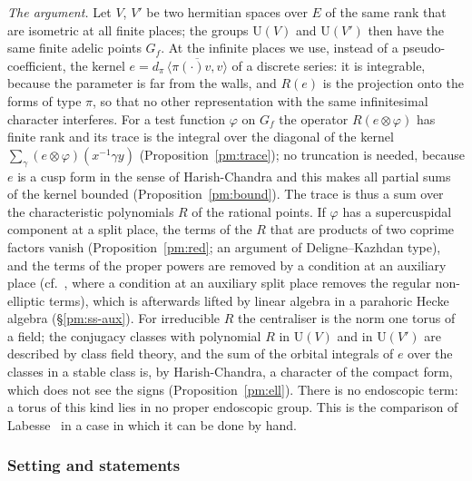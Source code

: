 \documentclass[10pt]{amsart}
\theoremstyle{definition}
\theoremstyle{remark}
\providecommand{\auU}{\mathrm U}
\providecommand{\aubar}[1]{\overline{#1}}
\begin{document}
\emph{The argument.} Let $V$, $V'$ be two hermitian spaces over $E$ of the same rank that are
isometric at all finite places; the groups $\auU(V)$ and $\auU(V')$ then have the same finite
adelic points $G_f$. At the infinite places we use, instead of a pseudo-coefficient, the kernel
$e=d_\pi\,\aubar{\langle\pi(\cdot)v,v\rangle}$ of a discrete series: it is integrable, because the
parameter is far from the walls, and $R(e)$ is the projection onto the forms of type $\pi$, so that
no other representation with the same infinitesimal character interferes. For a test function
$\varphi$ on $G_f$ the operator $R(e\otimes\varphi)$ has finite rank and its trace is the
integral over the diagonal of the kernel $\sum_\gamma(e\otimes\varphi)(x^{-1}\gamma y)$
(Proposition~\ref{pm:trace}); no truncation is needed, because $e$ is a cusp form in the sense of
Harish-Chandra and this makes all partial sums of the kernel bounded
(Proposition~\ref{pm:bound}). The trace is thus a sum over the characteristic polynomials $R$
of the rational points. If $\varphi$ has a supercuspidal component at a split place, the terms
of the $R$ that are products of two coprime factors vanish (Proposition~\ref{pm:red}; an
argument of Deligne--Kazhdan type), and the terms of the proper powers are
removed by a condition at an auxiliary place (cf.~\cite[Theorem~1]{FlickerKazhdan}, where a
condition at an auxiliary split place removes the regular non-elliptic terms), which is afterwards lifted by linear algebra in a
parahoric Hecke algebra (\S\ref{pm:ss-aux}). For irreducible $R$ the centraliser is the norm one
torus of a field; the conjugacy classes with polynomial $R$ in $\auU(V)$ and in $\auU(V')$ are
described by class field theory, and the sum of the orbital integrals of $e$ over the classes
in a stable class is, by Harish-Chandra, a character of the compact form, which does not see the
signs (Proposition~\ref{pm:ell}). There is no endoscopic term: a torus of this kind lies in no
proper endoscopic group. This is the comparison of Labesse~\cite{Labesse} in a case in which it can
be done by hand.

\subsubsection{Setting and statements}\label{pm:ss-setting}
\end{document}
